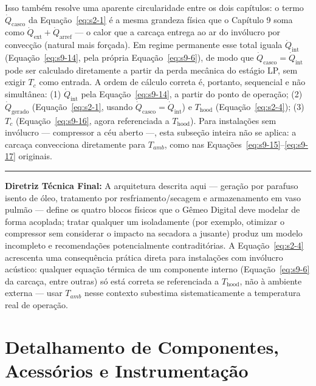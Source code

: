 \documentclass[12pt,a4paper]{article}
\numberwithin{equation}{section}
\numberwithin{table}{section}
\numberwithin{figure}{section}
\begin{document}
	Isso também resolve uma aparente circularidade entre os dois capítulos: o termo $\dot{Q}_{\text{casco}}$ da Equação~\eqref{eq:s2-1} é a mesma grandeza física que o Capítulo 9 soma como $\dot{Q}_{\text{ext}} + \dot{Q}_{\text{arref}}$ — o calor que a carcaça entrega ao ar do invólucro por convecção (natural mais forçada). Em regime permanente esse total iguala $\dot{Q}_{\text{int}}$ (Equação~\eqref{eq:s9-14}, pela própria Equação~\eqref{eq:s9-6}), de modo que $\dot{Q}_{\text{casco}} = \dot{Q}_{\text{int}}$ pode ser calculado diretamente a partir da perda mecânica do estágio LP, sem exigir $T_c$ como entrada. A ordem de cálculo correta é, portanto, sequencial e não simultânea: (1) $\dot{Q}_{\text{int}}$ pela Equação~\eqref{eq:s9-14}, a partir do ponto de operação; (2) $\dot{Q}_{\text{gerado}}$ (Equação~\eqref{eq:s2-1}, usando $\dot{Q}_{\text{casco}}=\dot{Q}_{\text{int}}$) e $T_{\text{hood}}$ (Equação~\eqref{eq:s2-4}); (3) $T_c$ (Equação~\eqref{eq:s9-16}, agora referenciada a $T_{\text{hood}}$). Para instalações sem invólucro — compressor a céu aberto —, esta subseção inteira não se aplica: a carcaça convecciona diretamente para $T_{amb}$, como nas Equações~\eqref{eq:s9-15}--\eqref{eq:s9-17} originais.

	\vspace{1em}
	\hrule
	\vspace{1em}

	\textbf{Diretriz Técnica Final:} A arquitetura descrita aqui — geração por parafuso isento de óleo, tratamento por resfriamento/secagem e armazenamento em vaso pulmão — define os quatro blocos físicos que o Gêmeo Digital deve modelar de forma acoplada; tratar qualquer um isoladamente (por exemplo, otimizar o compressor sem considerar o impacto na secadora a jusante) produz um modelo incompleto e recomendações potencialmente contraditórias. A Equação~\eqref{eq:s2-4} acrescenta uma consequência prática direta para instalações com invólucro acústico: qualquer equação térmica de um componente interno (Equação~\eqref{eq:s9-6} da carcaça, entre outras) só está correta se referenciada a $T_{\text{hood}}$, não à ambiente externa — usar $T_{amb}$ nesse contexto subestima sistematicamente a temperatura real de operação.

	
	
	\clearpage
	\section{\textbf{Detalhamento de Componentes, Acessórios e Instrumentação}}
\end{document}
